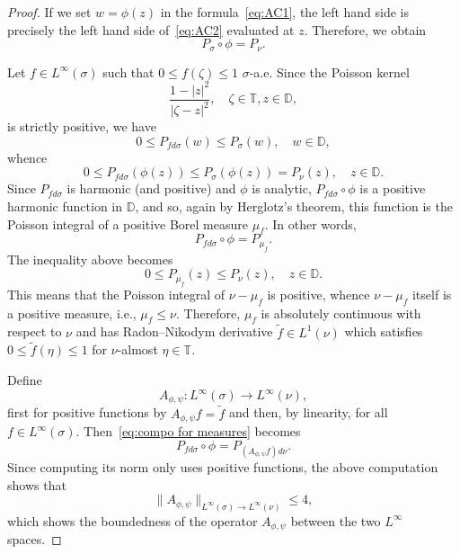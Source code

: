 \documentclass[11pt]{amsart}
\def\D{\mathbb{D}}
\def\T{\mathbb{T}}
\def\bbD{\mathbb{D}}
\renewcommand{\leq}{\leqslant}
\numberwithin{equation}{section}
\theoremstyle{plain}
\theoremstyle{definition}
\begin{document}
\begin{proof}
	If we set $w=\phi(z)$ in the  formula~\eqref{eq:AC1}, the left hand side is precisely the left hand side of~\eqref{eq:AC2} evaluated at $z$. Therefore, we obtain 
	\[
	P_\sigma \circ \phi = P_{\nu}.
	\]
	
Let $f\in L^\infty(\sigma)$ such that $0\leq f(\zeta)\leq 1$ $\sigma$-a.e. Since the Poisson kernel 
$$\frac{1-|z|^2}{|\zeta-z|^2}, \quad \zeta \in \T, z \in \D,$$ is strictly positive, we have 
\[
0\leq P_{fd\sigma}(w)\leq P_\sigma(w), \quad w \in \D,
\]	
whence
\[
0\leq P_{fd\sigma}(\phi(z))\leq P_\sigma(\phi(z))=P_\nu(z), \quad z \in \D.
\]
	Since $P_{fd\sigma}$ is harmonic (and positive) and $\phi$ is analytic, $P_{fd\sigma}\circ\phi$ is a positive harmonic function in $\bbD$, and so, again by Herglotz's theorem, this function  is the Poisson integral of a positive Borel measure $\mu_f$. In other words, 
	\begin{equation}\label{eq:compo for measures}
		P_{fd\sigma} \circ \phi =P_{\mu_f}.
	\end{equation}
	 The inequality above becomes
	\[
	0\leq P_{\mu_f}(z)\leq P_\nu(z), \quad z \in \D.
	\]
	This means that the Poisson integral of $\nu-\mu_f$
is positive, whence 	$\nu-\mu_f$ itself is a positive measure, i.e., $\mu_f\leq \nu$.
Therefore, $\mu_f$ is absolutely continuous with respect to $\nu$ and has Radon--Nikodym derivative $\widetilde f\in L^1(\nu)$ which satisfies $0\leq \widetilde f(\eta)\leq 1$ for $\nu$-almost $\eta\in \T$.

Define  $$A_{\phi, \psi}:L^\infty(\sigma)\to L^\infty(\nu),$$  first for positive functions by $A_{\phi, \psi} f=\widetilde f$ and then, by linearity, for all $f\in L^\infty(\sigma)$. Then~\eqref{eq:compo for measures} becomes
\begin{equation}\label{eq:AC6.5}
	P_{fd\sigma} \circ \phi =P_{(A_{\phi, \psi} f)d\nu}.
\end{equation}
Since computing its norm only uses positive functions, the above computation shows that 
\begin{equation}\label{0009iIU}
\|A_{\phi, \psi}\|_{L^{\infty}(\sigma) \to L^{\infty}(\nu)} \leq 4,
\end{equation}
which  shows the boundedness of the operator $A_{\phi, \psi}$ between the two $L^{\infty}$ spaces. 


\end{proof}
\end{document}
